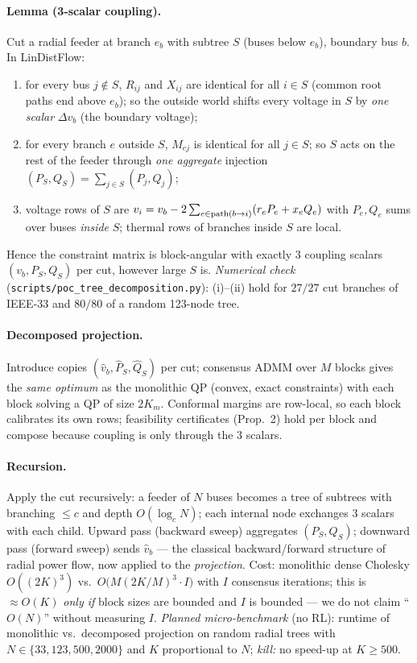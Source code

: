 \documentclass[10pt,a4paper]{article}
\begin{document}
\paragraph{Lemma (3-scalar coupling).} Cut a radial feeder at branch $e_b$ with subtree $S$ (buses below $e_b$), boundary bus $b$. In LinDistFlow:
\begin{enumerate}[label=(\roman*)]
\item for every bus $j\notin S$, $R_{ij}$ and $X_{ij}$ are identical for all $i\in S$ (common root paths end above $e_b$); so the outside world
shifts every voltage in $S$ by \emph{one scalar} $\Delta v_b$ (the boundary voltage);
\item for every branch $e$ outside $S$, $M_{ej}$ is identical for all $j\in S$; so $S$ acts on the rest of the feeder through \emph{one aggregate}
injection $(P_S,Q_S)=\sum_{j\in S}(P_j,Q_j)$;
\item voltage rows of $S$ are $v_i=v_b-2\sum_{e\in{\rm path}(b\to i)}(r_eP_e+x_eQ_e)$ with $P_e,Q_e$ sums over buses \emph{inside} $S$; thermal rows of branches inside $S$ are local.
\end{enumerate}
Hence the constraint matrix is block-angular with exactly $3$ coupling scalars $(v_b,P_S,Q_S)$ per cut, however large $S$ is.
\emph{Numerical check} (\texttt{scripts/poc\_tree\_decomposition.py}): (i)--(ii) hold for $27/27$ cut branches of IEEE-33 and $80/80$ of a random 123-node tree.
\paragraph{Decomposed projection.} Introduce copies $(\hat v_b,\hat P_S,\hat Q_S)$ per cut; consensus ADMM over $M$ blocks gives the \emph{same optimum}
as the monolithic QP (convex, exact constraints) with each block solving a QP of size $2K_m$. Conformal margins are row-local, so each block calibrates its own rows;
feasibility certificates (Prop.~2) hold per block and compose because coupling is only through the 3 scalars.
\paragraph{Recursion.} Apply the cut recursively: a feeder of $N$ buses becomes a tree of subtrees with branching $\le c$ and depth $O(\log_c N)$; each internal node
exchanges 3 scalars with each child. Upward pass (backward sweep) aggregates $(P_S,Q_S)$; downward pass (forward sweep) sends $\hat v_b$ --- the classical
backward/forward structure of radial power flow, now applied to the \emph{projection}. Cost: monolithic dense Cholesky $O((2K)^3)$ vs.\
$O\!\big(M(2K/M)^3\cdot I\big)$ with $I$ consensus iterations; this is $\approx O(K)$ \emph{only if} block sizes are bounded and $I$ is bounded --- we do not claim
``$O(N)$'' without measuring $I$. \emph{Planned micro-benchmark} (no RL): runtime of monolithic vs.\ decomposed projection on random radial trees with $N\in\{33,123,500,2000\}$ and $K$ proportional to $N$; \emph{kill:} no speed-up at $K\ge 500$.
\end{document}

